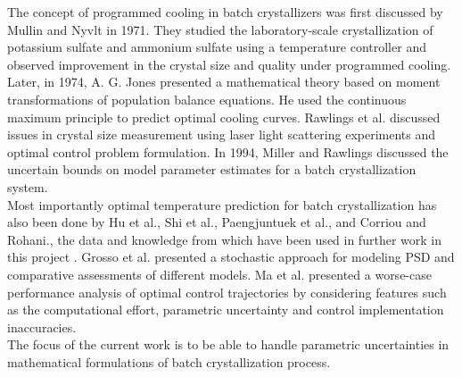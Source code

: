 The concept of programmed cooling in batch crystallizers was first discussed by Mullin and Nyvlt \cite{mullin} in 1971. They studied the laboratory-scale crystallization of potassium sulfate and ammonium sulfate using a temperature controller and observed improvement in the crystal size and quality under programmed cooling. \\
Later, in 1974, A. G. Jones \cite{agjones} presented a mathematical theory based on moment transformations of population balance equations. He used the continuous maximum principle to predict optimal cooling curves.
Rawlings et al. \cite{rawlings} discussed issues in crystal size measurement using laser light scattering experiments and optimal control problem formulation. In 1994, Miller and Rawlings \cite{miller_rawlings}  discussed the uncertain bounds on model parameter estimates for a batch crystallization system.\\ 
Most importantly optimal temperature prediction for batch crystallization has also been done by Hu et al.\cite{hu}, Shi et al.\cite{shi}, Paengjuntuek et al.\cite{paeng}, and Corriou and Rohani.\cite{corriou}, the data and knowledge from which have been used in further work in this project . Grosso et al.\cite{grosso} presented a stochastic approach for modeling PSD and comparative assessments of different models. Ma et al.\cite{ma} presented a worse-case performance analysis of optimal control trajectories by considering features such as the computational effort, parametric uncertainty and control implementation inaccuracies. \\
The focus of the current work is to be able to handle parametric uncertainties in mathematical formulations of batch crystallization process.
